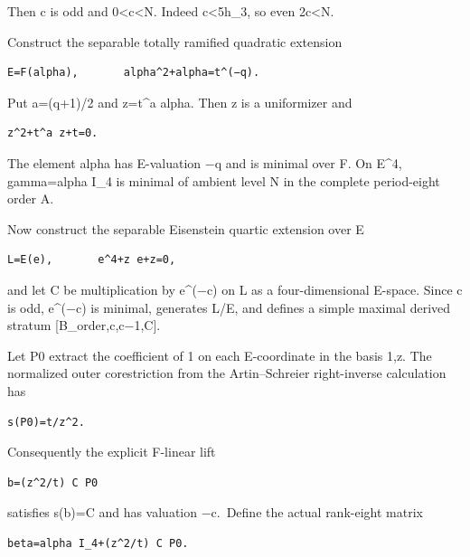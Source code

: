 Then c is odd and 0\textless c\textless N. Indeed c\textless5h\_3, so
even 2c\textless N.

Construct the separable totally ramified quadratic extension

\begin{Verbatim}[fontsize=\small,breaklines=true,breakanywhere=true]
E=F(alpha),       alpha^2+alpha=t^(−q).
\end{Verbatim}

Put a=(q+1)/2 and z=t\^{}a alpha. Then z is a uniformizer and

\begin{Verbatim}[fontsize=\small,breaklines=true,breakanywhere=true]
z^2+t^a z+t=0.
\end{Verbatim}

The element alpha has E-valuation −q and is minimal over F. On E\^{}4,
gamma=alpha I\_4 is minimal of ambient level N in the complete
period-eight order A.

Now construct the separable Eisenstein quartic extension over E

\begin{Verbatim}[fontsize=\small,breaklines=true,breakanywhere=true]
L=E(e),       e^4+z e+z=0,
\end{Verbatim}

and let C be multiplication by e\^{}(−c) on L as a four-dimensional
E-space. Since c is odd, e\^{}(−c) is minimal, generates L/E, and
defines a simple maximal derived stratum {[}B\_order,c,c−1,C{]}.

Let P0 extract the coefficient of 1 on each E-coordinate in the basis
1,z. The normalized outer corestriction from the Artin--Schreier
right-inverse calculation has

\begin{Verbatim}[fontsize=\small,breaklines=true,breakanywhere=true]
s(P0)=t/z^2.
\end{Verbatim}

Consequently the explicit F-linear lift

\begin{Verbatim}[fontsize=\small,breaklines=true,breakanywhere=true]
b=(z^2/t) C P0
\end{Verbatim}

satisfies s(b)=C and has valuation −c.~Define the actual rank-eight
matrix

\begin{Verbatim}[fontsize=\small,breaklines=true,breakanywhere=true]
beta=alpha I_4+(z^2/t) C P0.
\end{Verbatim}

